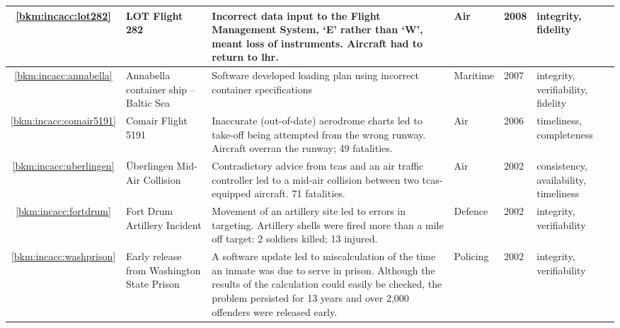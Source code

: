 \begin{longtable}{|C{}|L{}|L{}|L{}|L{}|L{}|}
	\hline
	\ref{bkm:incacc:lot282} & LOT Flight 282 & Incorrect data input to the Flight Management System, `E' rather than `W', meant loss of instruments. Aircraft had to return to \gls{lhr}. & Air & 2008 & \Gls{integrity}, \gls{fidelity} \\
	\hline
        \ref{bkm:incacc:annabella} & Annabella container ship -- Baltic Sea & Software developed loading plan using incorrect container specifications &
        Maritime & 2007 & \Gls{integrity}, \gls{verifiability}, \gls{fidelity} \\
        \hline
        \ref{bkm:incacc:comair5191} & Comair Flight 5191 & Inaccurate (out-of-date) aerodrome charts led to take-off being attempted from the wrong runway. Aircraft overran the runway; 49 fatalities. & Air & 2006 & \Gls{timeliness}, \gls{completeness} \\
	\hline
	\ref{bkm:incacc:uberlingen} & \"Uberlingen Mid-Air Collision & Contradictory advice from \gls{tcas} and an air traffic controller led to a mid-air collision between two \gls{tcas}-equipped aircraft. 71 fatalities. & Air & 2002 & \Gls{consistency}, \gls{availability}, \gls{timeliness} \\
	\hline
	\ref{bkm:incacc:fortdrum} & Fort Drum Artillery Incident & Movement of an artillery site led to errors in targeting. Artillery shells were fired more than a mile off target: 2 soldiers killed; 13 injured. & Defence & 2002 & \Gls{integrity}, \gls{verifiability} \\
	\hline
	\ref{bkm:incacc:washprison} & Early release from Washington State Prison & A software update led to miscalculation of the time an inmate was due to serve in prison. Although the results of the calculation could easily be checked, the problem persisted for 13 years and over 2,000 offenders were released early. & Policing & 2002 & \Gls{integrity}, \gls{verifiability} \\

\end{longtable}
